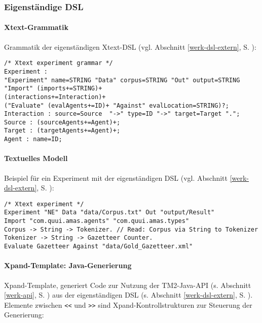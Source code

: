 \documentclass[abstracton, 12pt]{scrartcl}
\begin{document}
\subsubsection{Eigenständige DSL} \label{anhang-impl-xpand}

\paragraph{Xtext-Grammatik}

Grammatik der eigenständigen Xtext-DSL (vgl. Abschnitt \ref{werk-dsl-extern}, S. \pageref{werk-dsl-extern}):

\lstset{}
\begin{lstlisting}
/* Xtext experiment grammar */
Experiment :
"Experiment" name=STRING "Data" corpus=STRING "Out" output=STRING
"Import" (imports+=STRING)+
(interactions+=Interaction)+
("Evaluate" (evalAgents+=ID)+ "Against" evalLocation=STRING)?;
Interaction : source=Source  "->" type=ID "->" target=Target "."; 
Source : (sourceAgents+=Agent)+;
Target : (targetAgents+=Agent)+;
Agent : name=ID;
\end{lstlisting}

\paragraph{Textuelles Modell}

Beispiel für ein Experiment mit der eigenständigen DSL (vgl. Abschnitt \ref{werk-dsl-extern}, S. \pageref{werk-dsl-extern}):

\begin{lstlisting}
/* Xtext experiment */
Experiment "NE" Data "data/Corpus.txt" Out "output/Result"
Import "com.quui.amas.agents" "com.quui.amas.types"
Corpus -> String -> Tokenizer. // Read: Corpus via String to Tokenizer
Tokenizer -> String -> Gazetteer Counter.
Evaluate Gazetteer Against "data/Gold_Gazetteer.xml"
\end{lstlisting}

\paragraph{Xpand-Template: Java-Generierung}

Xpand-Template, generiert Code zur Nutzung der TM2-Java-API (s. Abschnitt \ref{werk-api}, S. \pageref{werk-api}) aus der eigenständigen DSL (s. Abschnitt \ref{werk-dsl-extern}, S. \pageref{werk-dsl-extern}). Elemente zwischen \lstinline!<<! und  \lstinline!>>! sind Xpand-Kontrollstrukturen zur Steuerung der Generierung:
\end{document}
